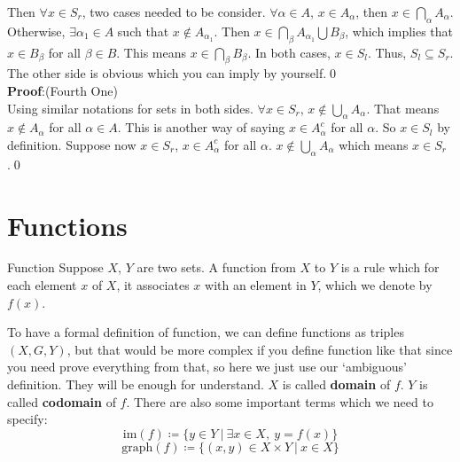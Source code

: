 \documentclass{article}
\begin{document}
Then $\forall x \in S_r$, two cases needed to be consider. $\forall \alpha \in A$, $x \in A_{\alpha}$, then
$x \in \bigcap_{\alpha} A_{\alpha}$. Otherwise, $\exists \alpha_1 \in A$ such that $x \notin A_{\alpha_1}$. Then 
$x \in \bigcap_{\beta} A_{\alpha_1} \bigcup B_{\beta}$, which implies that $x \in B_{\beta}$ for all $\beta \in B$. 
This means $x \in \bigcap_{\beta} B_{\beta}$. In both cases, $x \in S_l$. Thus, $S_l \subseteq S_r$. The other side 
is obvious which you can imply by yourself.\qed\\
\textbf{Proof}:(Fourth One)\\
Using similar notations for sets in both sides. $\forall x \in S_r$, $x \notin \bigcup_{\alpha} A_{\alpha}$. That means $x \notin A_\alpha$ for
all $\alpha \in A$. This is another way of saying $x \in A_{\alpha}^c$ for all $\alpha$. So $x \in S_l$ by definition. Suppose 
now $x \in S_r$, $x \in A_{\alpha}^c$ for all $\alpha$. $x \notin \bigcup_{\alpha} A_{\alpha}$ which means $x \in S_r$.\qed
\newpage
\section{Functions}
\begin{defin}{Function}
    Suppose $X$, $Y$ are two sets. A function from $X$ to $Y$ is a rule which for each element $x$ of $X$, it associates $x$ with an element in $Y$, 
    which we denote by $f(x)$.
\end{defin}
To have a formal definition of function, we can define functions as triples $(X, G, Y)$, but that would be more complex if you define function like that since you need 
prove everything from that, so here we just use our `ambiguous' definition. They will be enough for understand. $X$ is called \textbf{domain} of $f$. $Y$ is called \textbf{codomain} of $f$. There are also some important terms which we need to specify:
$$
\text{im}(f) \coloneq \{y \in Y\ |\ \exists x \in X,\ y = f(x)\}
$$
$$
\text{graph}(f) \coloneq \{(x,y) \in X \times Y\ |\ x \in X\}
$$
\end{document}
